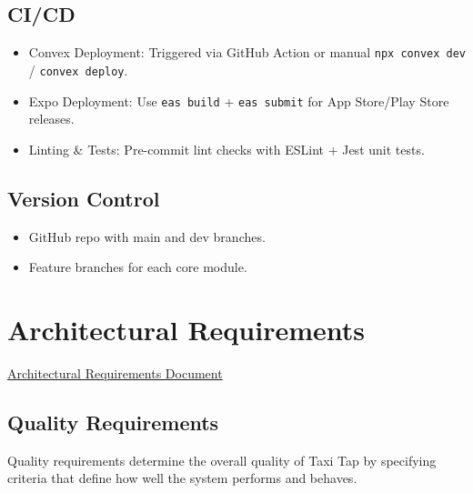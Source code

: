 \documentclass[a4paper,12pt]{article}
\begin{document}
\subsection{CI/CD}
\begin{itemize}
    \item Convex Deployment: Triggered via GitHub Action or manual \texttt{npx convex dev} / \texttt{convex deploy}.
    \item Expo Deployment: Use \texttt{eas build} + \texttt{eas submit} for App Store/Play Store releases.
    \item Linting \& Tests: Pre-commit lint checks with ESLint + Jest unit tests.
\end{itemize}

\subsection{Version Control}
\begin{itemize}
    \item GitHub repo with main and dev branches.
    \item Feature branches for each core module.
\end{itemize}

\section{Architectural Requirements}

\href{https://github.com/COS301-SE-2025/Taxi-Tap/blob/7a74ddb4e0d0e853188d32b984f07e9f6e0393c3/docs/Architectural\%20Requirements.pdf}{Architectural Requirements Document}

\subsection{Quality Requirements}
Quality requirements determine the overall quality of Taxi Tap by specifying criteria that define how well the system performs and behaves.
\end{document}

